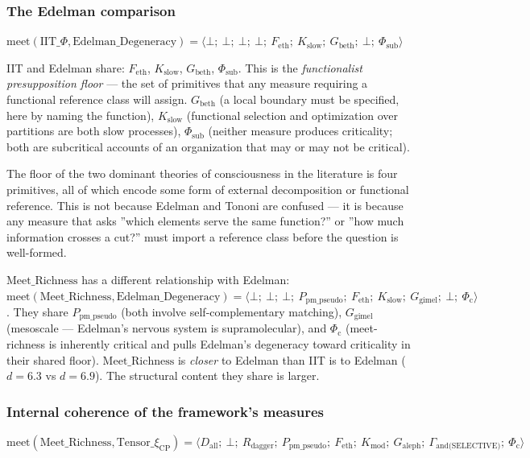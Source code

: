 \documentclass[12pt,a4paper]{article}
\begin{document}
\subsubsection{The Edelman comparison}

$\text{meet}(\mathrm{IIT}\_\Phi, \text{Edelman\_Degeneracy}) = \langle \bot;\ \bot;\ \bot;\ \bot;\ F_\text{eth};\ K_\text{slow};\ G_\text{beth};\ \bot;\ \Phi_\text{sub} \rangle$

IIT and Edelman share: $F_\text{eth}$, $K_\text{slow}$, $G_\text{beth}$, $\Phi_\text{sub}$. This is the \emph{functionalist presupposition floor} --- the set of primitives that any measure requiring a functional reference class will assign. $G_\text{beth}$ (a local boundary must be specified, here by naming the function), $K_\text{slow}$ (functional selection and optimization over partitions are both slow processes), $\Phi_\text{sub}$ (neither measure produces criticality; both are subcritical accounts of an organization that may or may not be critical).

The floor of the two dominant theories of consciousness in the literature is four primitives, all of which encode some form of external decomposition or functional reference. This is not because Edelman and Tononi are confused --- it is because any measure that asks ''which elements serve the same function?'' or ''how much information crosses a cut?'' must import a reference class before the question is well-formed.

$\text{Meet\_Richness}$ has a different relationship with Edelman: $\text{meet}(\text{Meet\_Richness}, \text{Edelman\_Degeneracy}) = \langle \bot;\ \bot;\ \bot;\ P_\text{pm\_pseudo};\ F_\text{eth};\ K_\text{slow};\ G_\text{gimel};\ \bot;\ \Phi_\text{c} \rangle$. They share $P_\text{pm\_pseudo}$ (both involve self-complementary matching), $G_\text{gimel}$ (mesoscale --- Edelman's nervous system is supramolecular), and $\Phi_\text{c}$ (meet-richness is inherently critical and pulls Edelman's degeneracy toward criticality in their shared floor). $\text{Meet\_Richness}$ is \emph{closer} to Edelman than IIT is to Edelman ($d = 6.3$ vs $d = 6.9$). The structural content they share is larger.

\subsubsection{Internal coherence of the framework's measures}

$\text{meet}(\text{Meet\_Richness}, \mathrm{Tensor}\_\xi_{\mathrm{CP}}) = \langle D_\text{all};\ \bot;\ R_\text{dagger};\ P_\text{pm\_pseudo};\ F_\text{eth};\ K_\text{mod};\ G_\text{aleph};\ \Gamma_\text{and(SELECTIVE)};\ \Phi_\text{c} \rangle$
\end{document}
